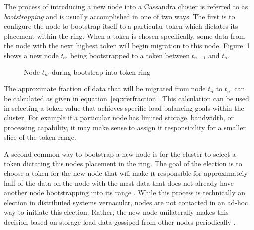\documentclass[twocolumn]{article}
\begin{document}
The process of introducing a new node into a Cassandra cluster is referred to as \emph{bootstrapping} and is usually accomplished in one of two ways.  The first is to configure the node to bootstrap itself to a particular token which dictates its placement within the ring.  When a token is chosen specifically, some data from the node with the next highest token will begin migration to this node.  Figure~\ref{fig:bootstrap} shows a new node $t_{n\prime}$ being bootstrapped to a token between $t_{n-1}$ and $t_n$.

\begin{figure}[hp]
  \begin{center}
  \end{center}
  \caption{Node $t_{n\prime}$ during bootstrap into token ring}
  \label{fig:bootstrap}
\end{figure}

The approximate fraction of data that will be migrated from node $t_n$ to $t_{n\prime}$ can be calculated as given in equation~\ref{eq:xferfraction}.  This calculation can be used in selecting a token value that achieves specific load balancing goals within the cluster.  For example if a particular node has limited storage, bandwidth, or processing capability, it may make sense to assign it responsibility for a smaller slice of the token range.

A second common way to bootstrap a new node is for the cluster to select a token dictating this nodes placement in the ring. The goal of the election is to choose a token for the new node that will make it responsible for approximately half of the data on the node with the most data that does not already have another node bootstrapping into its range \cite{ref:source,ref:cwiki}.  While this process is technically an election in distributed systems vernacular, nodes are not contacted in an ad-hoc way to initiate this election.  Rather, the new node unilaterally makes this decision based on storage load data gossiped from other nodes periodically \cite{ref:source,ref:cgossip}.
\end{document}
